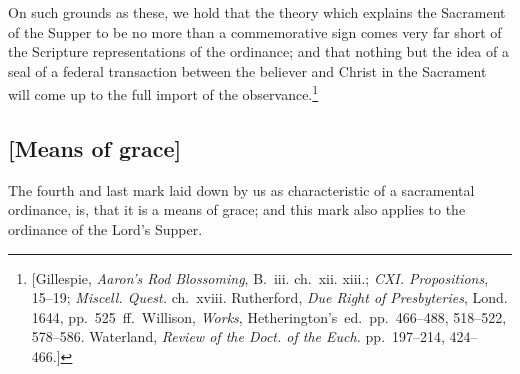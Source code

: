 \documentclass[
]{book}
\begin{document}
On such grounds as these, we hold that the theory which explains the Sacrament of the Supper to be no more than a commemorative sign comes very far short of the Scripture representations of the ordinance; and that nothing but the idea of a seal of a federal transaction between the believer and Christ in the Sacrament will come up to the full import of the observance.\footnote{{[}Gillespie, \emph{Aaron's Rod Blossoming}, B.~iii. ch.~xii. xiii.; \emph{CXI. Propositions}, 15--19; \emph{Miscell. Quest.} ch.~xviii. Rutherford, \emph{Due Right of Presbyteries}, Lond. 1644, pp.~525~ff.~Willison, \emph{Works}, Hetherington's~ed.~pp.~466--488, 518--522, 578--586. Waterland, \emph{Review of the Doct. of the Euch.} pp.~197--214, 424--466.{]}}

\hypertarget{means-of-grace-2}{%
\subsection{{[}Means of grace{]}}\label{means-of-grace-2}}

The fourth and last mark laid down by us as characteristic of a sacramental ordinance, is, that it is a means of grace; and this mark also applies to the ordinance of the Lord's Supper.
\end{document}
